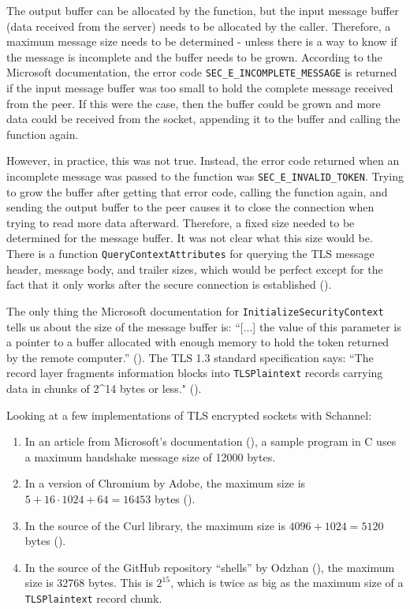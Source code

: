 \documentclass[12pt, a4paper]{article}
\begin{document}
The output buffer can be allocated by the function, but the input message buffer (data received from the server) needs to be allocated by the caller. Therefore, a maximum message size needs to be determined - unless there is a way to know if the message is incomplete and the buffer needs to be grown. According to the Microsoft documentation, the error code \texttt{SEC\_E\_INCOMPLETE\_MESSAGE} is returned if the input message buffer was too small to hold the complete message received from the peer. If this were the case, then the buffer could be grown and more data could be received from the socket, appending it to the buffer and calling the function again.

However, in practice, this was not true. Instead, the error code returned when an incomplete message was passed to the function was \texttt{SEC\_E\_INVALID\_TOKEN}. Trying to grow the buffer after getting that error code, calling the function again, and sending the output buffer to the peer causes it to close the connection when trying to read more data afterward. Therefore, a fixed size needed to be determined for the message buffer. It was not clear what this size would be. There is a function \texttt{QueryContextAttributes} for querying the TLS message header, message body, and trailer sizes, which would be perfect except for the fact that it only works after the secure connection is established (\cite{MicrosoftQueryContextAttributes}). 

The only thing the Microsoft documentation for \texttt{InitializeSecurityContext} tells us about the size of the message buffer is: “[...] the value of this parameter is a pointer to a buffer allocated with enough memory to hold the token returned by the remote computer.” (\cite{MicrosoftInitializeSecurityContext}). The TLS 1.3 standard specification says: “The record layer fragments information blocks into \texttt{TLSPlaintext} records carrying data in chunks of 2\^{}14 bytes or less." (\cite[][p. 78]{TlsSpec}). 

Looking at a few implementations of TLS encrypted sockets with Schannel:
\begin{enumerate}
	\item In an article from Microsoft’s documentation (\citeyear{SchannelUsageMicrosoft}), a sample program in C uses a maximum handshake message size of 12000 bytes.
	\item In a version of Chromium by Adobe, the maximum size is $5+16\cdot1024+64=16453$ bytes (\cite{SchannelUsageChromium}).
	\item In the source of the Curl library, the maximum size is $4096+1024=5120$ bytes (\cite{SchannelUsageLibcurl}).
	\item In the source of the GitHub repository “shells” by Odzhan (\citeyear{SchannelUsageOdzhanRepo}), the maximum size is 32768 bytes. This is $2^{15}$, which is twice as big as the maximum size of a \texttt{TLSPlaintext} record chunk.
\end{enumerate}
\end{document}
